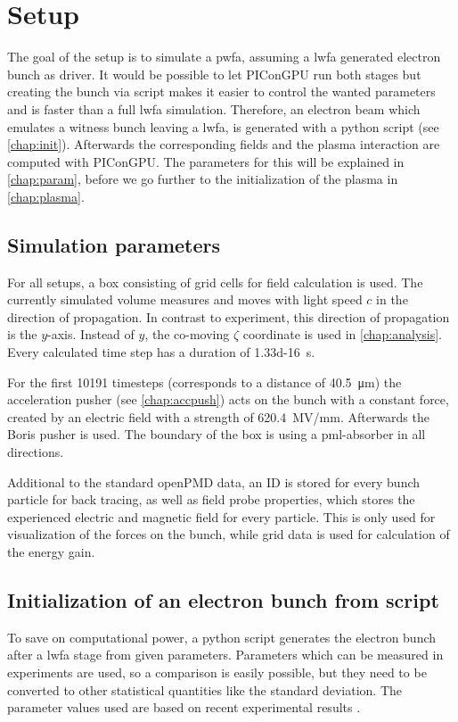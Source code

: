 \documentclass[bachelor_thesis]{subfiles}
\begin{document}
\chapter{Setup}\label{chap:setup}
The goal of the setup is to simulate a \gls{pwfa}, assuming a \gls{lwfa} generated electron bunch as driver. It would be possible to let PIConGPU run both stages but creating the bunch via script makes it easier to control the wanted parameters and is faster than a full \gls{lwfa} simulation.
Therefore, an electron beam which emulates a witness bunch leaving a \gls{lwfa}, is generated with a python script (see \autoref{chap:init}). Afterwards the corresponding fields and the plasma interaction are computed with PIConGPU. 
The parameters for this will  be explained in \autoref{chap:param}, before we go further to the initialization of the plasma in \autoref{chap:plasma}.


\section{Simulation parameters}\label{chap:param}
For all setups, a box consisting of  grid cells for field calculation is used. The currently simulated volume measures  and moves with light speed $c$ in the direction of propagation.
In contrast to experiment, this direction of propagation is the $y$-axis. Instead of $y$, the co-moving $\zeta$ coordinate is used in \autoref{chap:analysis}.
Every calculated time step has a duration of \qty{1.33d-16}{\s}. 

For the first \num{10191} timesteps (corresponds to a distance of \qty{40.5}{\um}) the acceleration pusher (see \autoref{chap:accpush}) acts on the bunch with a constant force, 
created by an electric field with a strength of \qty{620.4}{\mega\volt/\mm}. Afterwards the Boris pusher is used. 
The boundary of the box is using a \gls{pml}-absorber in all directions. 

Additional to the standard openPMD data, an ID is stored for every bunch particle for back tracing, as well as field probe properties, which stores the experienced electric and magnetic field for every particle. 
This is only used for visualization of the forces on the bunch, while grid data is used for calculation of the energy gain.


\section{Initialization of an electron bunch from script}\label{chap:init}
To save on computational power, a python script generates the electron bunch after a \gls{lwfa} stage from given parameters. Parameters which can be measured in experiments are used,
so a comparison is easily possible, but they need to be converted to other statistical quantities like the standard deviation. The parameter values used are based on recent experimental results \cite{Kurz2021, Schoebel2022, Cabadag2021}.
\end{document}
